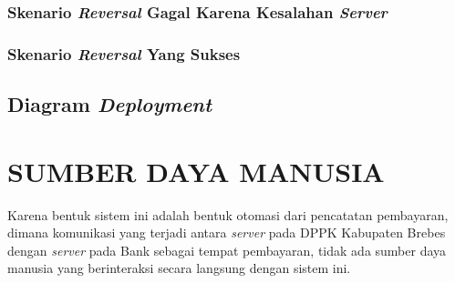 \documentclass[pdftex,12pt, oneside]{article}
\begin{document}
\subsubsection{Skenario \textit{Reversal} Gagal Karena Kesalahan \textit{Server}}
\subsubsection{Skenario \textit{Reversal} Yang Sukses}

\subsection{Diagram \textit{Deployment}}

\section{SUMBER DAYA MANUSIA}

Karena bentuk sistem ini adalah bentuk otomasi dari pencatatan pembayaran, dimana komunikasi yang terjadi antara \textit{server} pada DPPK Kabupaten Brebes dengan \textit{server} pada Bank sebagai tempat pembayaran, tidak ada sumber daya manusia yang berinteraksi secara langsung dengan sistem ini.
\end{document}
